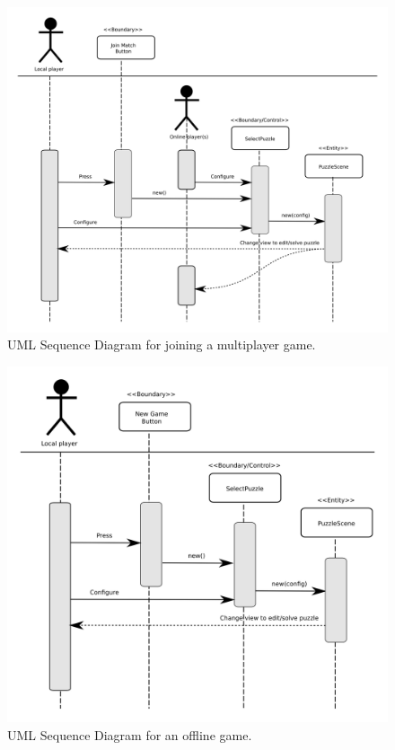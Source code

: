 \documentclass[12pt]{article}
\begin{document}
    \begin{figure}[H]
        \centering
        \includegraphics[width=4.5in]{sequence_join_match.png}
        \caption{UML Sequence Diagram for joining a multiplayer game.}
    \end{figure}


    \begin{figure}[H]
        \centering
        \includegraphics[width=4.5in]{sequence_offline_play.png}
        \caption{UML Sequence Diagram for an offline game.}
    \end{figure}
\end{document}
